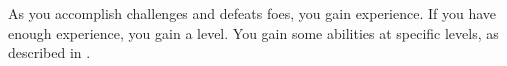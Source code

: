 


  As you accomplish challenges and defeats foes, you gain experience.
  If you have enough experience, you gain a level.
  You gain some abilities at specific levels, as described in .

